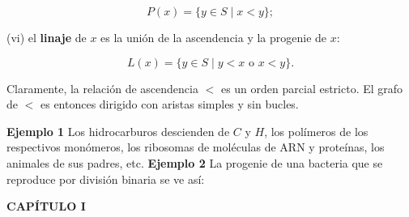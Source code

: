 {\[P(x) = \{y \in S \mid x < y\};\]

(vi) el \textbf{linaje} de \( x \) es la unión de la ascendencia y la progenie de \( x \):

\[L(x) = \{y \in S \mid y < x \text{ o } x < y\}.\]

Claramente, la relación de ascendencia \( < \) es un orden parcial estricto. El grafo de \( < \) es entonces dirigido con aristas simples y sin bucles.

\textbf{Ejemplo 1} Los hidrocarburos descienden de \( C \) y \( H \), los polímeros de los respectivos monómeros, los ribosomas de moléculas de ARN y proteínas, los animales de sus padres, etc. \textbf{Ejemplo 2} La progenie de una bacteria que se reproduce por división binaria se ve así:
}

\newpage
\fancyhf{}
\fancyhead[l]{\thepage}
\begin{center}
{\fontsize{16}{18}\selectfont \textbf{CAPÍTULO I}}
\end{center}
\vspace{0.5cm}

